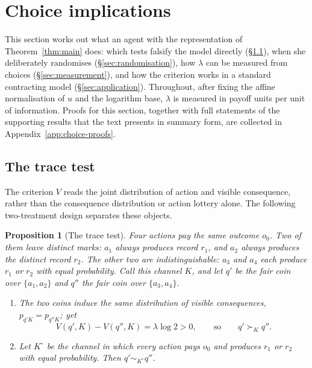 \documentclass[11pt,a4paper]{article}
\newtheorem{proposition}[theorem]{Proposition}
\theoremstyle{definition}
\newcommand{\1}{\mathbf 1}
\begin{document}
\section{Choice implications}\label{sec:implications}

This section works out what an agent with the representation of Theorem~\ref{thm:main} does: which tests
falsify the model directly (\S\ref{sec:tracetest}), when she deliberately randomises (\S\ref{sec:randomisation}),
how $\lambda$ can be measured from choices (\S\ref{sec:measurement}), and how the criterion works in a
standard contracting model (\S\ref{sec:application}).
Throughout, after fixing the affine normalisation of $u$ and the logarithm base, $\lambda$ is measured in payoff units per unit of information.  Proofs for this
section, together with full statements of the supporting results that the text presents in summary form, are
collected in Appendix~\ref{app:choice-proofs}.

\subsection{The trace test}\label{sec:tracetest}

The criterion $V$ reads the joint distribution of action and visible consequence, rather than the consequence
distribution or action lottery alone.  The following two-treatment design separates these objects.

\begin{proposition}[The trace test]\label{prop:signature}
Four actions pay the same outcome $o_0$.  Two of them leave distinct marks: $a_1$ always produces record $r_1$,
and $a_2$ always produces the distinct record $r_2$.  The other two are indistinguishable: $a_3$ and $a_4$ each
produce $r_1$ or $r_2$ with equal probability.  Call this channel $K$, and let $q'$ be the fair coin over
$\{a_1,a_2\}$ and $q''$ the fair coin over $\{a_3,a_4\}$.
\begin{enumerate}[label=\textup{(\roman*)},leftmargin=*]
\item The two coins induce the same distribution of visible consequences, $p_{q'K}=p_{q''K}$; yet
\[
 V(q',K)-V(q'',K)=\lambda\log2>0,
 \qquad\text{so}\qquad
 q'\succ_Kq''.
\]
\item Let $K^\circ$ be the channel in which every action pays $o_0$ and produces $r_1$ or $r_2$ with equal
probability.  Then $q'\sim_{K^\circ}q''$.
\end{enumerate}
\end{proposition}
\end{document}
